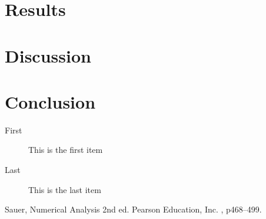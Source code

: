 \documentclass[DIV=calc, paper=a4, fontsize=11pt, twocolumn]{scrartcl}   %
\begin{document}
\section*{Results}

\section*{Discussion}

\section*{Conclusion}

\lipsum[8] %

\begin{description}
\item[First] This is the first item
\item[Last] This is the last item
\end{description}

\lipsum[9] %


\begin{thebibliography}{99} %

Sauer, Numerical Analysis 2nd ed. Pearson Education, Inc.
, p468--499.

\end{thebibliography}

\end{document}
